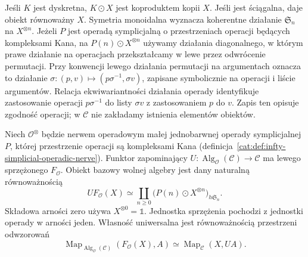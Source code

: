 Jeśli $K$ jest dyskretna, $K\odot X$ jest koproduktem kopii $X$. Jeśli jest ściągalna, daje obiekt równoważny $X$. Symetria monoidalna wyznacza koherentne działanie $\mathfrak S_n$ na $X^{\otimes n}$. Jeżeli $P$ jest operadą symplicjalną o przestrzeniach operacji będących kompleksami Kana, na $P(n)\odot X^{\otimes n}$ używamy działania diagonalnego, w którym prawe działanie na operacjach przekształcamy w lewe przez odwrócenie permutacji. Przy konwencji lewego działania permutacji na argumentach oznacza to działanie $\sigma:(p,v)\mapsto(p\sigma^{-1},\sigma v)$, zapisane symbolicznie na operacji i liście argumentów. Relacja ekwiwariantności działania operady identyfikuje zastosowanie operacji $p\sigma^{-1}$ do listy $\sigma v$ z zastosowaniem $p$ do $v$. Zapis ten opisuje zgodność operacji; w $\mathcal C$ nie zakładamy istnienia elementów obiektów.

\begin{twierdzenie}\label{cat:thm:infty-free-operad-algebra}
Niech $\mathcal O^\otimes$ będzie nerwem operadowym małej jednobarwnej operady symplicjalnej $P$, której przestrzenie operacji są kompleksami Kana (definicja~\ref{cat:def:infty-simplicial-operadic-nerve}). Funktor zapominający $U:\operatorname{Alg}_{\mathcal O}(\mathcal C)\to\mathcal C$ ma lewego sprzężonego $F_{\mathcal O}$. Obiekt bazowy wolnej algebry jest dany naturalną równoważnością
\begin{equation}\label{cat:eq:infty-free-operad-algebra}
 UF_{\mathcal O}(X)\simeq
 \coprod_{n\geq0}\bigl(P(n)\odot X^{\otimes n}\bigr)_{h\mathfrak S_n}.
\end{equation}
Składowa arności zero używa $X^{\otimes0}=\mathbb 1$. Jednostka sprzężenia pochodzi z jednostki operady w arności jeden. Własność uniwersalna jest równoważnością przestrzeni odwzorowań
\[
 \operatorname{Map}_{\operatorname{Alg}_{\mathcal O}(\mathcal C)}
 (F_{\mathcal O}(X),A)
 \simeq \operatorname{Map}_{\mathcal C}(X,UA).
\]
\end{twierdzenie}

